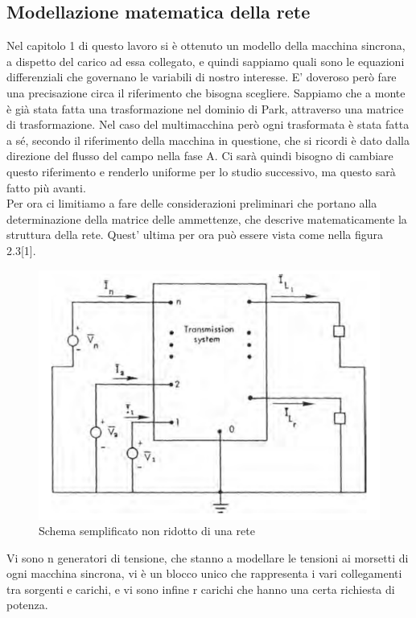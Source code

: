 \documentclass[Lau,noexaminfo]{sapthesis}
\begin{document}
	\subsection{Modellazione matematica della rete}
	Nel capitolo 1 di questo lavoro si è ottenuto un modello della macchina sincrona, a dispetto del carico ad essa collegato, e quindi sappiamo quali sono le equazioni differenziali che governano le variabili di nostro interesse. E' doveroso però fare una precisazione circa il riferimento che bisogna scegliere. Sappiamo che a monte è già stata fatta una trasformazione nel dominio di Park, attraverso una matrice di trasformazione. Nel caso del multimacchina però ogni trasformata è stata fatta a sé, secondo il riferimento della macchina in questione, che si ricordi è dato dalla direzione del flusso del campo nella fase A. Ci sarà quindi bisogno di cambiare questo riferimento e renderlo uniforme per lo studio successivo, ma questo sarà fatto più avanti.\\
	Per ora ci limitiamo a fare delle considerazioni preliminari che portano alla determinazione della matrice delle ammettenze, che descrive matematicamente la struttura della rete. Quest' ultima per ora può essere vista come nella figura 2.3[1].
	\begin{figure}
		\centering
		\includegraphics[height=0.3\textheight]{nonridotta}
		\caption{Schema semplificato non ridotto di una rete}
	\end{figure}
	Vi sono n generatori di tensione, che stanno a modellare le tensioni ai morsetti di ogni macchina sincrona, vi è un blocco unico che rappresenta i vari collegamenti tra sorgenti e carichi, e vi sono infine r carichi che hanno una certa richiesta di potenza.
\end{document}
